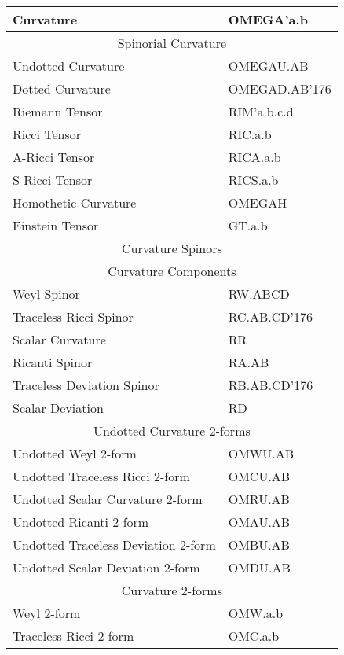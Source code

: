 \documentclass[twoside,openright]{report}
\newcommand{\grgtt}{\ttfamily}
\renewcommand{\tt}{\grgtt}
\newcommand{\cc}{{\tt \char'176}}           %
\begin{document}
\begin{center}
\label{curspincoll}
\begin{tabular}{|l|l|}\hline
\tt    Curvature           &\tt   OMEGA'a.b\\
\hline
\multicolumn{2}{|c|}{\tt    Spinorial Curvature}\\
\tt    Undotted Curvature  &\tt   OMEGAU.AB\\
\tt    Dotted Curvature    &\tt   OMEGAD.AB\cc\\
\hline
\tt    Riemann Tensor      &\tt   RIM'a.b.c.d\\
\tt    Ricci Tensor        &\tt   RIC.a.b\\
\tt    A-Ricci Tensor      &\tt   RICA.a.b\\
\tt    S-Ricci Tensor      &\tt   RICS.a.b\\
\tt    Homothetic Curvature &\tt  OMEGAH\\
\tt    Einstein Tensor      &\tt  GT.a.b\\
\hline
\multicolumn{2}{|c|}{\tt    Curvature Spinors}\\
\multicolumn{2}{|c|}{\tt    Curvature Components}\\
\tt    Weyl Spinor                &\tt  RW.ABCD\\
\tt    Traceless Ricci Spinor     &\tt  RC.AB.CD\cc\\
\tt    Scalar Curvature           &\tt  RR\\
\tt    Ricanti Spinor             &\tt  RA.AB\\
\tt    Traceless Deviation Spinor &\tt  RB.AB.CD\cc\\
\tt    Scalar Deviation           &\tt  RD\\
\hline
\multicolumn{2}{|c|}{\tt Undotted Curvature 2-forms}\\
\tt    Undotted Weyl 2-form                &\tt  OMWU.AB \\
\tt    Undotted Traceless Ricci 2-form     &\tt  OMCU.AB \\
\tt    Undotted Scalar Curvature 2-form    &\tt  OMRU.AB \\
\tt    Undotted Ricanti 2-form             &\tt  OMAU.AB \\
\tt    Undotted Traceless Deviation 2-form &\tt  OMBU.AB \\
\tt    Undotted Scalar Deviation 2-form    &\tt  OMDU.AB \\
\hline
\multicolumn{2}{|c|}{\tt  Curvature 2-forms}\\
\tt    Weyl 2-form                     &\tt    OMW.a.b \\
\tt    Traceless Ricci 2-form          &\tt    OMC.a.b \\

\end{tabular}
\end{center}
\end{document}
